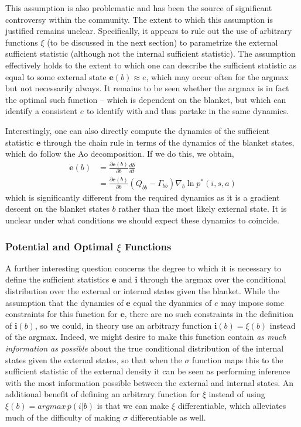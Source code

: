 This assumption is also problematic and has been the source of significant controversy within the community. The extent to which this assumption is justified remains unclear. Specifically, it appears to rule out the use of arbitrary functions $\xi$ (to be discussed in the next section) to parametrize the external sufficient statistic (although not the internal sufficient statistic). The assumption effectively holds to the extent to which one can describe the sufficient statistic as equal to some external state $\boldsymbol{e}(b) \approx e$, which may occur often for the argmax but not necessarily always. It remains to be seen whether the argmax is in fact the optimal such function -- which is dependent on the blanket, but which can identify a consistent $e$ to identify with and thus partake in the same dynamics.

Interestingly, one can also directly compute the dynamics of the sufficient statistic $\boldsymbol{e}$ through the chain rule in terms of the dynamics of the blanket states, which do follow the Ao decomposition. If we do this, we obtain,
\begin{align*}
    \dot{\boldsymbol{e}}(b) &= \frac{\partial \boldsymbol{e}(b)}{\partial b} \frac{db}{dt} \\
    &= \frac{\partial \boldsymbol{e}(b)}{\partial b} (Q_{bb} - \Gamma_{bb}) \nabla_b \ln p^*(i,s,a)
\end{align*}
which is significantly different from the required dynamics as it is a gradient descent on the blanket states $b$ rather than the most likely external state. It is unclear under what conditions we should expect these dynamics to coincide. 

\subsubsection{Potential and Optimal $\xi$ Functions}

A further interesting question concerns the degree to which it is necessary to define the sufficient statistics $\boldsymbol{e}$ and $\boldsymbol{i}$ through the argmax over the conditional distribution over the external or internal states given the blanket. While the assumption that the dynamics of $\boldsymbol{e}$ equal the dyanmics of $e$ may impose some constraints for this function for $\boldsymbol{e}$, there are no such constraints in the definition of $\boldsymbol{i}(b)$, so we could, in theory use an arbitrary function $\boldsymbol{i}(b) = \xi(b)$ instead of the argmax. Indeed, we might desire to make this function contain \emph{as much information as possible} about the true conditional distribution of the internal states given the external states, so that when the $\sigma$ function maps this to the sufficient statistic of the external density it can be seen as performing inference with the most information possible between the external and internal states. An additional benefit of defining an arbitrary function for $\xi$ instead of using $\xi(b) = argmax \, p(i| b)$ is that we can make $\xi$ differentiable, which alleviates much of the difficulty of making $\sigma$ differentiable as well.

